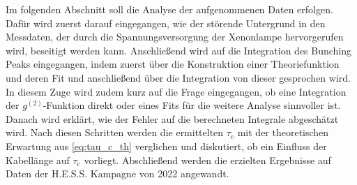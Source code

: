 Im folgenden Abschnitt soll die Analyse der aufgenommenen Daten erfolgen. 
Dafür wird zuerst darauf eingegangen, wie der störende Untergrund in den Messdaten, der durch die Spannungsversorgung der Xenonlampe hervorgerufen wird, beseitigt werden kann. 
Anschließend wird auf die Integration des Bunching Peaks eingegangen, indem zuerst über die Konstruktion einer Theoriefunktion und deren Fit und anschließend über die Integration von dieser gesprochen wird. 
In diesem Zuge wird zudem kurz auf die Frage eingegangen, ob eine Integration der $g^{(2)}$-Funktion direkt oder eines Fits für die weitere Analyse sinnvoller ist. 
Danach wird erklärt, wie der Fehler auf die berechneten Integrale abgeschätzt wird. 
Nach diesen Schritten werden die ermittelten $\tau_{\mathrm{c}}$ mit der theoretischen Erwartung aus \autoref{eq:tau_c_th} verglichen und diskutiert, ob ein Einfluss der Kabellänge auf $\tau_{\mathrm{c}}$ vorliegt. 
Abschließend werden die erzielten Ergebnisse auf Daten der H.E.S.S. Kampagne von 2022 angewandt. 

